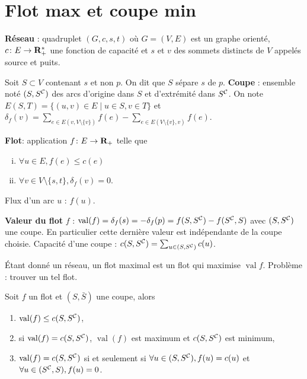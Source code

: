 \documentclass[a4paper,10pt,twocolumn]{article}
\DeclareMathOperator{\val}{val}
\begin{document}
\section{Flot max et coupe min}

	\begin{defn}
	\textbf{Réseau} : quadruplet $(G,c,s,t)$ où $G = (V,E)$ est un graphe orienté, $c \colon E \to \mathbf{R}_+^*$ une fonction de capacité et $s$ et $v$ des sommets distincts de $V$ appelés source et puits.
	\end{defn}

	\begin{note}
	Soit $S \subset V$ contenant $s$ et non $p$.
	On dit que $S$ sépare $s$ de $p$.
	\textbf{Coupe} : ensemble noté $(S,{S}^{\mathcal{C}})$ des arcs d'origine dans $S$ et d'extrémité dans ${S}^{\mathcal{C}}$.
	On note $E(S,T) = \{ (u,v) \in E \mid u \in S, v \in T \}$ et $\delta_f(v) = \sum_{e \in E(v,V \setminus \{ v \})} f(e) - \sum_{e \in E(V \setminus \{ v \},v)} f(e)$.
	\end{note}

	\begin{defn}
	\textbf{Flot}: application $f \colon E \to \mathbf{R}_+$ telle que
		\begin{enumerate}[i)]
		\item $\forall u \in E, f(e) \leq c(e)$
		\item $\forall v \in V \setminus \{ s,t \}, \delta_f(v) = 0$.
		\end{enumerate}
	Flux d'un arc $u$ : $f(u)$.
	\end{defn}

	\begin{defn}
	\textbf{Valeur du flot} $f$ : $\val(f) = \delta_f(s) = - \delta_f(p) = f(S,\compl{S}) - f(\compl{S},S)$ avec $(S,{S}^{\mathcal{C}})$ une coupe.
	En particulier cette dernière valeur est indépendante de la coupe choisie.
	Capacité d'une coupe : $c(S,{S}^{\mathcal{C}}) = \sum_{u \in (S,{S}^{\mathcal{C}})} c(u)$.
	\end{defn}

	\begin{defn}
	Étant donné un réseau, un flot maximal est un flot qui maximise $\val{f}$.
	Problème :  trouver un tel flot.
	\end{defn}

	\begin{thm}
	Soit $f$ un flot et $(S,\bar{S})$ une coupe, alors
		\begin{enumerate}
		\item $\val(f) \leq c(S,\compl{S})$,
		\item si $\val(f) = c(S,\compl{S})$, $\val(f)$ est maximum et $c(S,{S}^{\mathcal{C}})$ est minimum,
		\item $\val(f) = c(S,\compl{S})$ si et seulement si $\forall u \in (S,{S}^{\mathcal{C}}), f(u) = c(u)$ et $\forall u \in ({S}^{\mathcal{C}},S), f(u) = 0$.
		\end{enumerate}
	\end{thm}
\end{document}
